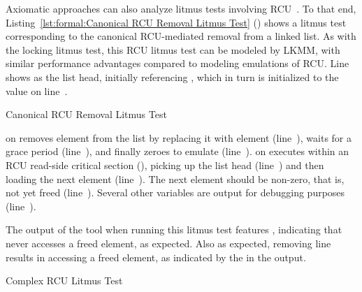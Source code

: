 \begin{fcvref}
Axiomatic approaches can also analyze litmus tests involving
RCU~\cite{Alglave:2018:FSC:3173162.3177156}.
To that end,
Listing~\ref{lst:formal:Canonical RCU Removal Litmus Test}
()
shows a litmus test corresponding to the canonical RCU-mediated
removal from a linked list.
As with the locking litmus test, this RCU litmus test can be
modeled by LKMM, with similar performance advantages compared
to modeling emulations of RCU.
Line~ shows  as the list head, initially
referencing , which in turn is initialized to the value
 on line~.

\begin{listing}[tb]

\caption{Canonical RCU Removal Litmus Test}
\label{lst:formal:Canonical RCU Removal Litmus Test}
\end{listing}

 on 
removes element  from the list by replacing it with element 
(line~),
waits for a grace period (line~),
and finally zeroes  to emulate  (line~).
 on 
executes within an RCU read-side critical section
(),
picking up the list head (line~) and then
loading the next element (line~).
The next element should be non-zero, that is, not yet freed
(line~).
Several other variables are output for debugging purposes
(line~).

The output of the  tool when running this litmus test features
, indicating that  never accesses a freed element,
as expected.
Also as expected, removing line~ results in 
accessing a freed element, as indicated by the  in
the  output.
\end{fcvref}

\begin{listing}[tb]

\caption{Complex RCU Litmus Test}
\label{lst:formal:Complex RCU Litmus Test}
\end{listing}


